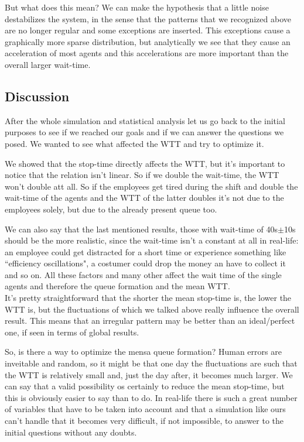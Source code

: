 \documentclass[11pt]{article}
\begin{document}
But what does this mean? We can make the hypothesis that a little noise destabilizes the system, in the sense that the patterns that we recognized above are no longer regular and some exceptions are inserted. This exceptions cause a graphically more sparse distribution, but analytically we see that they cause an acceleration of most agents and this accelerations are more important than the overall larger wait-time.

\subsection{Discussion}

After the whole simulation and statistical analysis let us go back to the initial purposes to see if we reached our goals and if we can answer the questions we posed. We wanted to see what affected the WTT and try to optimize it. 

We showed that the stop-time directly affects the WTT, but it's important to notice that the relation isn't linear. So if we double the wait-time, the WTT won't double att all. So if the employees get tired during the shift and double the wait-time of the agents and the WTT of the latter doubles it's not due to the employees solely, but due to the already present queue too.

We can also say that the last mentioned results, those with wait-time of 40s$\pm$10s should be the more realistic, since the wait-time isn't a constant at all in real-life: an employee could get distracted for a short time or experience something like ``efficiency oscillations", a costumer could drop the money an have to collect it and so on. All these factors and many other affect the wait time of the single agents and therefore the queue formation and the mean WTT. \\
It's pretty straightforward that the shorter the mean stop-time is, the lower the WTT is, but the fluctuations of which we talked above really influence the overall result. This means that an irregular pattern may be better than an ideal/perfect one, if seen in terms of global results.

So, is there a way to optimize the mensa queue formation? Human errors are inveitable and random, so it might be that one day the fluctuations are such that the WTT is relatively small and, just the day after, it becomes much larger. We can say that a valid possibility os certainly to reduce the mean stop-time, but this is obviously easier to say than to do. In real-life there is such a great number of variables that have to be taken into account and that a simulation like ours can't handle that it becomes very difficult, if not impossible, to answer to the initial questions without any doubts.
\end{document}
